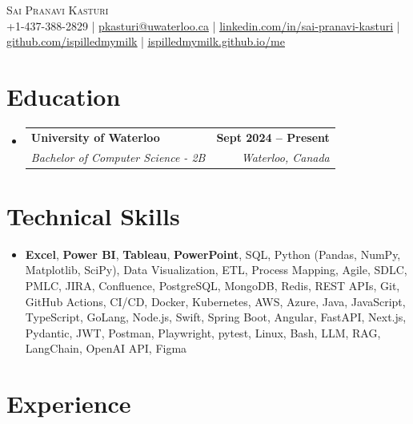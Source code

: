 \documentclass[letterpaper,10pt]{article}
\makeatletter
\newcommand{\resumeSubheading}[4]{
  \vspace{-1pt}\item
    \begin{tabular*}{1.0\textwidth}[t]{l@{\extracolsep{\fill}}r}
      \textbf{#1} & \textbf{\small #2} \\
      \textit{\small#3} & \textit{\small #4} \\[-2pt]
    \end{tabular*}\vspace{-7pt}
}
\newcommand{\resumeSubHeadingListStart}{\begin{itemize}[leftmargin=0.0in, label={}]}
\newcommand{\resumeSubHeadingListEnd}{\end{itemize}}
\makeatother
\begin{document}

\vspace{-28pt}
\begin{center}
    {\Huge \scshape Sai Pranavi Kasturi} \\ 
    
    \small +1-437-388-2829 | \underline{pkasturi@uwaterloo.ca} | \href{https://linkedin.com/in/sai-pranavi-kasturi-704807298}{\underline{linkedin.com/in/sai-pranavi-kasturi}} | \href{https://github.com/ispilledmymilk}{\underline{github.com/ispilledmymilk}} | \href{https://ispilledmymilk.github.io/me/}{\underline{ispilledmymilk.github.io/me}}
    \vspace{-10pt}
\end{center}

\vspace{-10pt}
\section{Education}
  \resumeSubHeadingListStart
    \resumeSubheading
      {University of Waterloo}{Sept 2024 -- Present}
      {Bachelor of Computer Science - 2B}{Waterloo, Canada}
  \resumeSubHeadingListEnd
\vspace{-8pt}
  

\section{Technical Skills}
\begin{itemize}[leftmargin=0.05in, label={}]
  \small\item{
    \textbf{Excel}, \textbf{Power BI}, \textbf{Tableau}, \textbf{PowerPoint}, SQL, Python (Pandas, NumPy, Matplotlib, SciPy), Data Visualization, ETL, Process Mapping, Agile, SDLC, PMLC, JIRA, Confluence, PostgreSQL, MongoDB, Redis, REST APIs, Git, GitHub Actions, CI/CD, Docker, Kubernetes, AWS, Azure, Java, JavaScript, TypeScript, GoLang, Node.js, Swift, Spring Boot, Angular, FastAPI, Next.js, Pydantic, JWT, Postman, Playwright, pytest, Linux, Bash, LLM, RAG, LangChain, OpenAI API, Figma
  }
\end{itemize}
 \vspace{-18pt}

\vspace{1.20pt}
\section{Experience}
\end{document}
